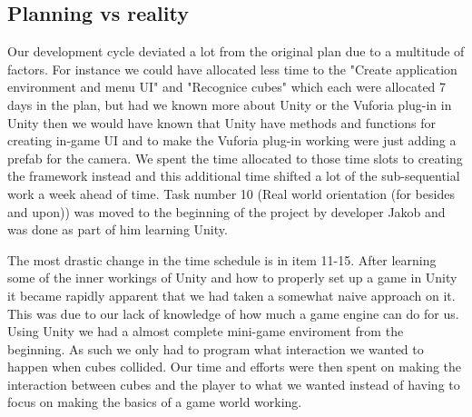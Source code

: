 
\subsection{Planning vs reality}%
Our development cycle deviated a lot from the original plan due to a multitude of factors.
For instance we could have allocated less time to the "Create application environment and menu UI" and "Recognice cubes" which each were allocated 7 days in the plan, but had we known more about Unity or the Vuforia plug-in in Unity then we would have known that Unity have methods and functions for creating in-game UI and to make the Vuforia plug-in working were just adding a \gls{prefab} for the camera.
We spent the time allocated to those time slots to creating the framework instead and this additional time shifted a lot of the sub-sequential work a week ahead of time.
Task number 10 (Real world orientation (for besides and upon)) was moved to the beginning of the project by developer Jakob and was done as part of him learning Unity.

The most drastic change in the time schedule is in item 11-15.
After learning some of the inner workings of Unity and how to properly set up a game in Unity it became rapidly apparent that we had taken a somewhat naive approach on it. This was due to our lack of knowledge of how much a game engine can do for us.
Using Unity we had a almost complete mini-game enviroment from the beginning. As such we only had to program what interaction we wanted to happen when cubes collided.
Our time and efforts were then spent on making the interaction between cubes and the player to what we wanted instead of having to focus on making the basics of a game world working.